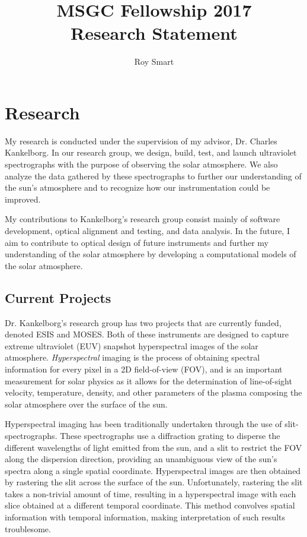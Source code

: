 \documentclass[10pt,letterpaper]{article}
\author{Roy Smart}
\title{MSGC Fellowship 2017 \\ Research Statement}
\begin{document}
	
	\maketitle
	
	\section{Research}
	
		My research is conducted under the supervision of my advisor, Dr. Charles Kankelborg. In our research group, we design, build, test, and launch ultraviolet spectrographs with the purpose of observing the solar atmosphere. We also analyze the data gathered by these spectrographs to further our understanding of the sun's atmosphere and to recognize how our instrumentation could be improved.
		
		My contributions to Kankelborg's research group consist mainly of software development, optical alignment and testing, and data analysis. In the future, I aim to contribute to optical design of future instruments and further my understanding of the solar atmosphere by developing a computational models of the solar atmosphere.
	
		\subsection{Current Projects}
		
			Dr. Kankelborg's research group has two projects that are currently funded, denoted ESIS and MOSES. Both of these instruments are designed to capture extreme ultraviolet (EUV) snapshot hyperspectral images of the solar atmosphere. \textit{Hyperspectral} imaging is the process of obtaining spectral information for every pixel in a 2D field-of-view (FOV), and is an important measurement for solar physics as it allows for the determination of line-of-sight velocity, temperature, density, and other parameters of the plasma composing the solar atmosphere over the surface of the sun. 
			
			Hyperspectral imaging has been traditionally undertaken through the use of slit-spectrographs. These spectrographs use a diffraction grating to disperse the different wavelengths of light emitted from the sun, and a slit to restrict the FOV along the dispersion direction, providing an unambiguous view of the sun's spectra along a single spatial coordinate. Hyperspectral images are then obtained by rastering the slit across the surface of the sun. Unfortunately, rastering the slit takes a non-trivial amount of time, resulting in a hyperspectral image with each slice obtained at a different temporal coordinate. This method convolves spatial information with temporal information, making interpretation of such results troublesome.
			
\end{document}
